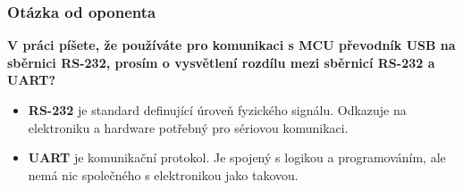 \documentclass[%
  12pt,       				%
	t,                  %
	aspectratio=1610,   %
	unicode,						%
]{beamer}				    	%
\begin{document}
\begin{frame} 
	\frametitle{Otázka od oponenta}
	
	{\bf V práci píšete, že používáte pro komunikaci s MCU převodník USB na 
	sběrnici RS-232, prosím o vysvětlení rozdílu mezi sběrnicí RS-232 a UART? }
	
	\begin{itemize}
		\item {\bf RS-232} je standard definující úroveň fyzického signálu.
		Odkazuje na elektroniku a hardware potřebný pro sériovou komunikaci. 

		\item {\bf UART} je komunikační protokol. Je spojený s logikou a
		programováním, ale nemá nic společného s elektronikou jako takovou. 
	\end{itemize}	
\end{frame}

\end{document}
